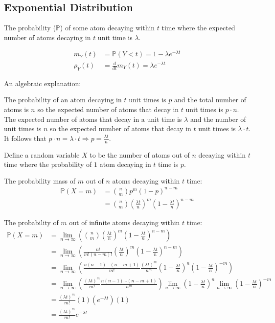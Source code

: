 \documentclass{article}
\begin{document}
	\subsection{Exponential Distribution}
	The probability ($\mathbb{P}$) of some atom decaying within $t$ time where the expected number of atoms decaying in $t$ unit time is $\lambda$.

	\begin{align*}
		m_Y(t) &= \mathbb{P}(Y < t) = 1 - \lambda e^{-\lambda t} \\
		\rho_Y(t) &= \frac{d}{dt}m_Y(t) = \lambda e^{-\lambda t}
	\end{align*}

	An algebraic explanation:

	The probability of an atom decaying in $t$ unit times is $p$ and the total number of atoms is $n$ so the expected number of atoms that decay in $t$ unit times is $p\cdot n$.
	The expected number of atoms that decay in a unit time is $\lambda$ and the number of unit times is $n$ so the expected number of atoms that decay in $t$ unit times is $\lambda\cdot t$.
	It follows that $p\cdot n = \lambda\cdot t \Rightarrow p = \frac{\lambda t}{n}$.

	Define a random variable $X$ to be the number of atoms out of $n$ decaying within $t$ time where the probability of $1$ atom decaying in $t$ time is $p$.

	The probability mass of $m$ out of $n$ atoms decaying within $t$ time:
	\begin{align*}
		\mathbb{P}(X=m) &= \binom{n}{m}p^m(1-p)^{n-m} \\
		&= \binom{n}{m}\left(\frac{\lambda t}{n}\right)^m\left(1-\frac{\lambda t}{n}\right)^{n-m}
	\end{align*}

	The probability of $m$ out of infinite atoms decaying within $t$ time:
	\begin{align*}
		\mathbb{P}(X=m) &= \lim_{n\to\infty}\left(\binom{n}{m}\left(\frac{\lambda t}{n}\right)^m\left(1-\frac{\lambda t}{n}\right)^{n-m}\right) \\
		&= \lim_{n\to\infty}\left(\frac{n!}{m!(n-m)!} \left(\frac{\lambda t}{n}\right)^m \left(1-\frac{\lambda t}{n}\right)^{n-m}\right) \\
		&= \lim_{n\to\infty}\left(\frac{n(n-1)\cdots(n-m+1)}{m!} \frac{(\lambda t)^m}{n^m} \left(1-\frac{\lambda t}{n}\right)^n \left(1-\frac{\lambda t}{n}\right)^{-m}\right) \\
		&= \lim_{n\to\infty}\left(\frac{(\lambda t)^m}{m!} \frac{n(n-1)\cdots(n-m+1)}{n^m}\right) \lim_{n\to\infty}\left(1-\frac{\lambda t}{n}\right)^n \lim_{n\to\infty}\left(1-\frac{\lambda t}{n}\right)^{-m} \\
		&= \frac{(\lambda t)^m}{m!} (1) (e^{-\lambda t}) (1) \\
		&= \frac{(\lambda t)^m}{m!}e^{-\lambda t}
	\end{align*}
\end{document}
